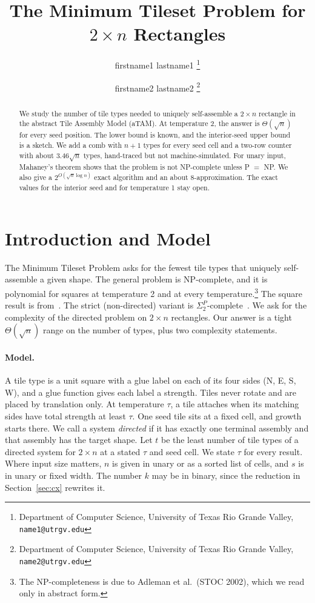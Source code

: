 \documentclass[10pt]{hackr26}
\title{The Minimum Tileset Problem for $2\times n$ Rectangles}
\author{
    firstname1 lastname1
    \thanks{Department of Computer Science, University of Texas Rio Grande Valley, {\tt name1@utrgv.edu}}
    \and
    firstname2 lastname2
    \thanks{Department of Computer Science, University of Texas Rio Grande Valley, {\tt name2@utrgv.edu}}
}
\begin{document}
\maketitle
\begin{abstract}
We study the number of tile types needed to uniquely self-assemble a $2\times n$ rectangle in the abstract Tile Assembly Model (aTAM).
At temperature 2, the answer is $\Theta(\sqrt n)$ for every seed position.
The lower bound is known, and the interior-seed upper bound is a sketch.
We add a comb with $n+1$ types for every seed cell and a two-row counter with about $3.46\sqrt n$ types, hand-traced but not machine-simulated.
For unary input, Mahaney's theorem shows that the problem is not NP-complete unless P $=$ NP.
We also give a $2^{O(\sqrt n\log n)}$ exact algorithm and an about 8-approximation.
The exact values for the interior seed and for temperature 1 stay open.
\end{abstract}
\section{Introduction and Model} \label{sec:intro}

The Minimum Tileset Problem asks for the fewest tile types that uniquely self-assemble a given shape.
The general problem is NP-complete, and it is polynomial for squares at temperature 2 and at every temperature.\footnote{The NP-completeness is due to Adleman et al.\ (STOC 2002), which we read only in abstract form. %
}
The square result is from~\cite{CDS11}.
The strict (non-directed) variant is $\Sigma_2^P$-complete~\cite{BCDKS11}.
We ask for the complexity of the directed problem on $2\times n$ rectangles.
Our answer is a tight $\Theta(\sqrt n)$ range on the number of types, plus two complexity statements.

\paragraph{Model.}
A tile type is a unit square with a glue label on each of its four sides (N, E, S, W), and a glue function gives each label a strength.
Tiles never rotate and are placed by translation only.
At temperature $\tau$, a tile attaches when its matching sides have total strength at least $\tau$.
One seed tile sits at a fixed cell, and growth starts there.
We call a system \emph{directed} if it has exactly one terminal assembly and that assembly has the target shape.
Let $t$ be the least number of tile types of a directed system for $2\times n$ at a stated $\tau$ and seed cell.
We state $\tau$ for every result.
Where input size matters, $n$ is given in unary or as a sorted list of cells, and $s$ is in unary or fixed width.
The number $k$ may be in binary, since the reduction in Section~\ref{sec:cx} rewrites it.
\end{document}
